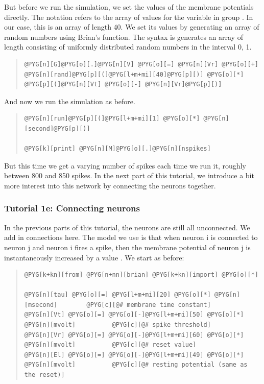 \documentclass[letterpaper,10pt,english]{manual}
\begin{document}
But before we run the simulation, we set the values of the
membrane potentials directly. The notation  refers
to the array of values for the variable  in group . In
our case, this is an array of length 40. We set its values
by generating an array of random numbers using Brian's
 function. The syntax is  generates an
array of length  consisting of uniformly distributed
random numbers in the interval 0, 1.
\begin{quote}

\begin{Verbatim}[commandchars=@\[\]]
@PYG[n][G]@PYG[o][.]@PYG[n][V] @PYG[o][=] @PYG[n][Vr] @PYG[o][+] @PYG[n][rand]@PYG[p][(]@PYG[l+m+mi][40]@PYG[p][)] @PYG[o][*] @PYG[p][(]@PYG[n][Vt] @PYG[o][-] @PYG[n][Vr]@PYG[p][)]
\end{Verbatim}
\end{quote}

And now we run the simulation as before.
\begin{quote}

\begin{Verbatim}[commandchars=@\[\]]
@PYG[n][run]@PYG[p][(]@PYG[l+m+mi][1] @PYG[o][*] @PYG[n][second]@PYG[p][)]

@PYG[k][print] @PYG[n][M]@PYG[o][.]@PYG[n][nspikes]
\end{Verbatim}
\end{quote}

But this time we get a varying number of spikes each time
we run it, roughly between 800 and 850 spikes. In the
next part of this tutorial, we introduce a bit more
interest into this network by connecting the neurons together.

\resetcurrentobjects
\hypertarget{--doc-tutorial_1e_connecting_neurons}{}

\subsubsection{Tutorial 1e: Connecting neurons}

In the previous parts of this tutorial, the neurons are
still all unconnected. We add in connections here. The
model we use is that when neuron i is connected to
neuron j and neuron i fires a spike, then the membrane
potential of neuron j is instantaneously increased by
a value . We start as before:
\begin{quote}

\begin{Verbatim}[commandchars=@\[\]]
@PYG[k+kn][from] @PYG[n+nn][brian] @PYG[k+kn][import] @PYG[o][*]

@PYG[n][tau] @PYG[o][=] @PYG[l+m+mi][20] @PYG[o][*] @PYG[n][msecond]        @PYG[c][@# membrane time constant]
@PYG[n][Vt] @PYG[o][=] @PYG[o][-]@PYG[l+m+mi][50] @PYG[o][*] @PYG[n][mvolt]          @PYG[c][@# spike threshold]
@PYG[n][Vr] @PYG[o][=] @PYG[o][-]@PYG[l+m+mi][60] @PYG[o][*] @PYG[n][mvolt]          @PYG[c][@# reset value]
@PYG[n][El] @PYG[o][=] @PYG[o][-]@PYG[l+m+mi][49] @PYG[o][*] @PYG[n][mvolt]          @PYG[c][@# resting potential (same as the reset)]
\end{Verbatim}
\end{quote}
\end{document}
